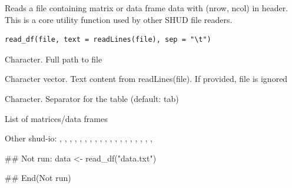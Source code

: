 \documentclass[a4paper]{book}
\begin{document}
%
\begin{Description}\relax
Reads a file containing matrix or data frame data with (nrow, ncol) in header.
This is a core utility function used by other SHUD file readers.
\end{Description}
%
\begin{Usage}
\begin{verbatim}
read_df(file, text = readLines(file), sep = "\t")
\end{verbatim}
\end{Usage}
%
\begin{Arguments}
\begin{ldescription}
\item[\code{file}] Character. Full path to file

\item[\code{text}] Character vector. Text content from readLines(file). If provided, file is ignored

\item[\code{sep}] Character. Separator for the table (default: tab)
\end{ldescription}
\end{Arguments}
%
\begin{Value}
List of matrices/data frames
\end{Value}
%
\begin{SeeAlso}\relax
Other shud-io: 
,
,
,
,
,
,
,
,
,
,
,
,
,
,
,
,
,
,
,
\end{SeeAlso}
%
\begin{Examples}
\begin{ExampleCode}
## Not run: 
data <- read_df("data.txt")

## End(Not run)
\end{ExampleCode}
\end{Examples}
\end{document}
